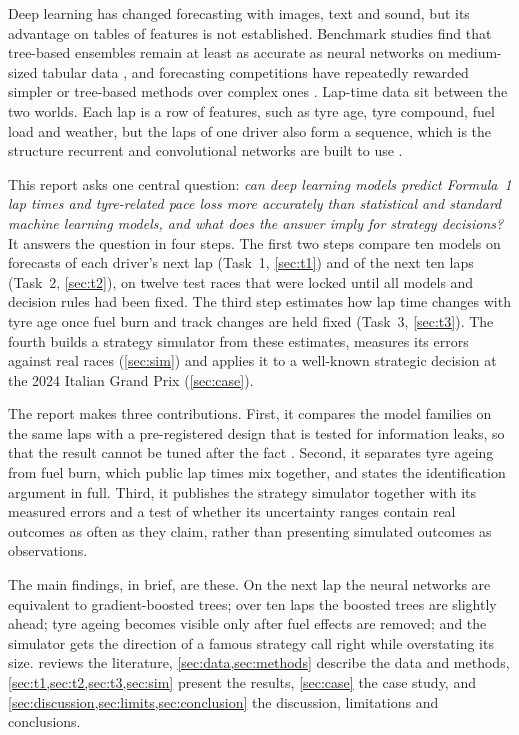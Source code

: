 \documentclass[12pt]{article}
\begin{document}
Deep learning has changed forecasting with images, text and sound, but its advantage on tables of features is not
established. Benchmark studies find that tree-based ensembles remain at least as accurate as neural networks on
medium-sized tabular data \parencite{grinsztajn2022,shwartzziv2022,borisov2024}, and forecasting competitions have
repeatedly rewarded simpler or tree-based methods over complex ones
\parencite{makridakis2018,makridakis2022}. Lap-time data sit between the two worlds. Each lap is a row of features,
such as tyre age, tyre compound, fuel load and weather, but the laps of one driver also form a sequence, which is the
structure recurrent and convolutional networks are built to use \parencite{hochreiter1997,bai2018}.

This report asks one central question: \emph{can deep learning models predict Formula~1 lap times and tyre-related pace
loss more accurately than statistical and standard machine learning models, and what does the answer imply for strategy
decisions?} It answers the question in four steps. The first two steps compare ten models on forecasts of each
driver's next lap (Task~1, \cref{sec:t1}) and of the next ten laps (Task~2, \cref{sec:t2}), on twelve test races that
were locked until all models and decision rules had been fixed. The third step estimates how lap time changes with tyre
age once fuel burn and track changes are held fixed (Task~3, \cref{sec:t3}). The fourth builds a strategy simulator
from these estimates, measures its errors against real races (\cref{sec:sim}) and applies it to a well-known strategic
decision at the 2024 Italian Grand Prix (\cref{sec:case}).

The report makes three contributions. First, it compares the model families on the same laps with a pre-registered
design that is tested for information leaks, so that the result cannot be tuned after the fact
\parencite{nosek2018,kapoor2023}. Second, it separates tyre ageing from fuel burn, which public lap times mix together,
and states the identification argument in full. Third, it publishes the strategy simulator together with its measured
errors and a test of whether its uncertainty ranges contain real outcomes as often as they claim, rather than presenting simulated
outcomes as observations.

The main findings, in brief, are these. On the next lap the neural networks are equivalent to gradient-boosted trees;
over ten laps the boosted trees are slightly ahead; tyre ageing becomes visible only after fuel effects are removed; and
the simulator gets the direction of a famous strategy call right while overstating its size.  reviews the
literature, \cref{sec:data,sec:methods} describe the data and methods, \cref{sec:t1,sec:t2,sec:t3,sec:sim} present the
results, \cref{sec:case} the case study, and \cref{sec:discussion,sec:limits,sec:conclusion} the discussion,
limitations and conclusions.
\end{document}
